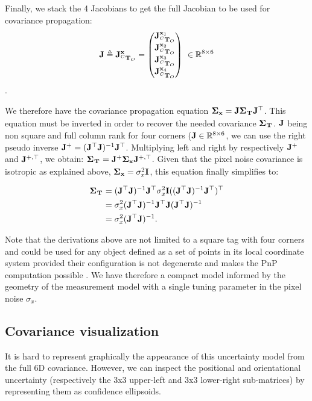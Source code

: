 Finally, we stack the 4 Jacobians to get the full Jacobian to be used for covariance propagation:
%
\begin{equation}
    {\bf J} \triangleq {\bf J}^{{\bf x}}_{\prescript{C}{}{{\bf T}}_{O}}=
    \begin{pmatrix}
    {\bf J}^{{\bf x}_1}_{\prescript{C}{}{{\bf T}}_{O}} \\ 
    {\bf J}^{{\bf x}_2}_{\prescript{C}{}{{\bf T}}_{O}} \\ 
    {\bf J}^{{\bf x}_3}_{\prescript{C}{}{{\bf T}}_{O}} \\ 
    {\bf J}^{{\bf x}_4}_{\prescript{C}{}{{\bf T}}_{O}}
    \end{pmatrix}
    ~ \in \mathbb{R}^{8 \times 6}
\end{equation}.

We therefore have the covariance propagation equation ${\bm \Sigma}_{{\bf x}} = {\bf J} {\bm \Sigma}_{\prescript{}{}{{\bf T}}_{}} {\bf J}^{\top}$. 
This equation must be inverted in order to recover the needed covariance ${\bm \Sigma}_{\prescript{}{}{{\bf T}}_{}}$. ${\bf J}$ being non square and full column rank for four 
corners (${\bf J} \in \mathbb{R}^{8 \times 6}$, we can use the right pseudo inverse ${\bf J}^{+} = ({\bf J}^{\top} {\bf J})^{-1}{\bf J}^{\top}$. Multiplying left and right by 
respectively ${\bf J}^{+}$ and ${\bf J}^{+,\top}$, we obtain: ${\bm \Sigma}_{\prescript{}{}{{\bf T}}_{}} = {\bf J}^{+} {\bm \Sigma}_{{\bf x}} {\bf J}^{+,\top}$. Given that the pixel noise covariance is 
isotropic as explained above, ${\bm \Sigma}_{{\bf x}} = \sigma_x^2 {\bf I}$, this equation finally simplifies to:

\begin{align}
    {\bm \Sigma}_{\prescript{}{}{{\bf T}}_{}} 
    &=  ({\bf J}^{\top} {\bf J})^{-1}{\bf J} ^{\top} \sigma_x^2 {\bf I} (({\bf J}^{\top} {\bf J})^{-1}{\bf J}^{\top})^{\top} \notag\\
    &=  \sigma_x^2 ({\bf J}^{\top} {\bf J})^{-1} {\bf J}^{\top} {\bf J} ({\bf J}^{\top} {\bf J})^{-1} \notag\\
    &= \sigma_{x}^2({\bf J}^{\top} {\bf J})^{-1}.
\end{align}

Note that the derivations above are not limited to a square tag with four corners and could be used for any object defined as
a set of points in its local coordinate system provided their configuration is not degenerate and makes the PnP computation possible \cite{gao2003complete}.  
We have therefore a compact model informed by the geometry of the measurement model with a single tuning parameter in the pixel noise $\sigma_x$.


\subsection{Covariance visualization}

It is hard to represent graphically the appearance of this uncertainty model from the full 6D covariance. However, we can inspect the positional and 
orientational uncertainty (respectively the 3x3 upper-left and 3x3 lower-right sub-matrices) by representing them as confidence ellipsoids.

